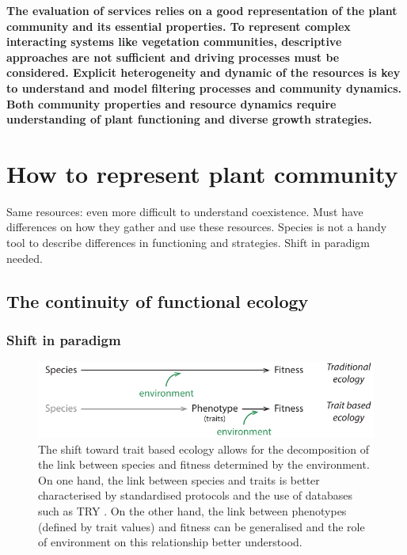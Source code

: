  \textbf{The evaluation of services relies on a good representation of the plant community and its essential properties. To represent complex interacting systems like vegetation communities, descriptive approaches are not sufficient and driving processes must be considered. Explicit heterogeneity and dynamic of the resources is key to understand and model filtering processes and community dynamics. Both community properties and resource dynamics require understanding of plant functioning and diverse growth strategies.}
 

\chapter{How to represent plant community}

Same resources: even more difficult to understand coexistence. Must have differences on how they gather and use these resources. Species is not a handy tool to describe differences in functioning and strategies. Shift in paradigm needed.

\section{The continuity of functional ecology}

\subsection{Shift in paradigm}

\begin{figure}
    \includegraphics[width=1\linewidth]{./2_PP/Figures/Concepts/species_to_fitness.pdf}
  \caption[From discrete to continuous link between species and fitness]{The shift toward trait based ecology allows for the decomposition of the link between species and fitness determined by the environment. On one hand, the link between species and traits is better characterised by standardised protocols and the use of databases such as TRY \parencite{TRY}. On the other hand, the link between phenotypes (defined by trait values) and fitness can be generalised and the role of environment on this relationship better understood.}
  \label{fg:PCA_calibration}
\end{figure}




